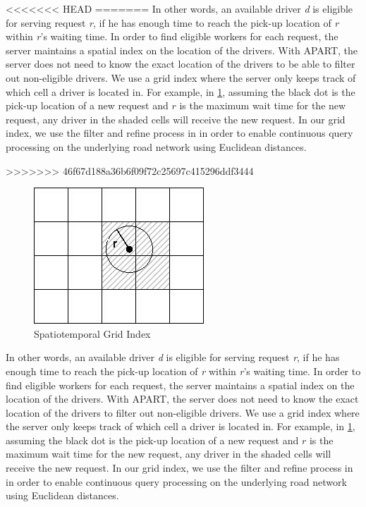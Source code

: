 <<<<<<< HEAD
\vspace{-2mm}
=======
\noindent In other words, an available driver \textit{d} is eligible for serving request \textit{r}, if he has enough time to reach the pick-up location of \textit{r} within \textit{r}'s waiting time. In order to find eligible workers for each request, the server maintains a spatial index on the location of the drivers. With APART, the server does not need to know the exact location of the drivers to be able to filter out non-eligible drivers. We use a grid index where the server only keeps track of which cell a driver is located in. For example, in \cref{fig:grid_index}, assuming the black dot is the pick-up location of a new request and $r$ is the maximum wait time for the new request, any driver in the shaded cells will receive the new request. In our grid index, we use the filter and refine process in \cite{Demiryurek09} in order to enable continuous query processing on the underlying road network using Euclidean distances.

>>>>>>> 46f67d188a36b6f09f72c25697c415296ddf3444
\begin{figure}[!ht]
	\centering
	\includegraphics[width=0.35\columnwidth]{fig/grid_index.jpg}
	\vspace{-0mm}\caption{Spatiotemporal Grid Index} \vspace{-2mm} \label{fig:grid_index}
\end{figure}\vspace{-0mm}

\noindent In other words, an available driver \textit{d} is eligible for serving request \textit{r}, if he has enough time to reach the pick-up location of \textit{r} within \textit{r}'s waiting time. In order to find eligible workers for each request, the server maintains a spatial index on the location of the drivers. With APART, the server does not need to know the exact location of the drivers to filter out non-eligible drivers. We use a grid index where the server only keeps track of which cell a driver is located in. For example, in \cref{fig:grid_index}, assuming the black dot is the pick-up location of a new request and $r$ is the maximum wait time for the new request, any driver in the shaded cells will receive the new request. In our grid index, we use the filter and refine process in \cite{Demiryurek09} in order to enable continuous query processing on the underlying road network using Euclidean distances.


